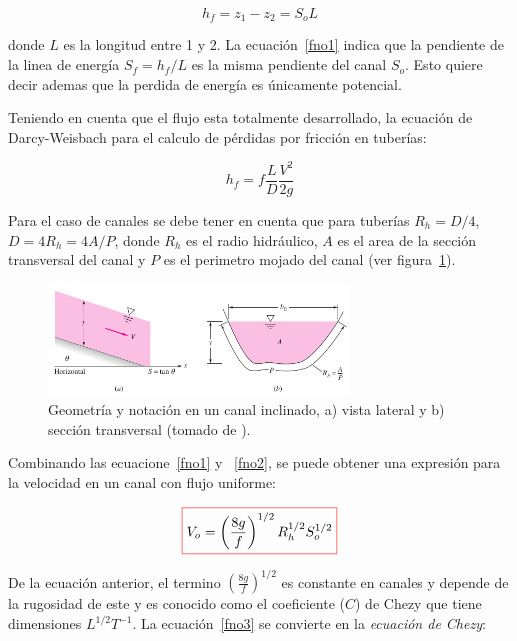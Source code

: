 \documentclass[11pt, oneside]{article}
\begin{document}
\begin{equation}
h_f = z_1 - z_2 = S_o L
\label{fno1}
\end{equation}

donde $L$ es la longitud entre 1 y 2. La ecuaci\'on~\ref{fno1} indica que la pendiente de la linea de energ\'ia $S_f = h_f /L$ es la misma pendiente del canal $S_o$. Esto quiere decir ademas que la perdida de energ\'ia es \'unicamente potencial. 

Teniendo en cuenta que el flujo esta totalmente desarrollado, la ecuaci\'on de Darcy-Weisbach para el calculo de p\'erdidas por fricci\'on en tuber\'ias:

\begin{equation}
h_f = f \frac{L}{D}\frac{V^2}{2g}
\label{fno2}
\end{equation}

Para el caso de canales se debe tener en cuenta que para tuber\'ias $R_h =D/4$, $D = 4R_h = 4A/P$, donde $R_h$ es el radio hidr\'aulico, $A$ es el area de la secci\'on transversal del canal y $P$ es el perimetro mojado del canal (ver figura~\ref{fnor2}).

\begin{figure}[h]
\centering
\includegraphics[width=8cm]{fnor2.png}
\caption{Geometr\'ia y notaci\'on en un canal inclinado, a) vista lateral y b) secci\'on transversal (tomado de \cite{white1990fluid}).}
\label{fnor2}
\end{figure}

Combinando las ecuacione~\ref{fno1} y ~\ref{fno2}, se puede obtener una expresi\'on para la velocidad en un canal con flujo uniforme:

\begin{equation}
\color{red}\boxed{\color{black} V_o = \left( \frac{8g}{f} \right)^{1/2} R_h^{1/2} S_o^{1/2} }
\label{fno3}
\end{equation}

De la ecuaci\'on anterior, el termino $\left( \frac{8g}{f} \right)^{1/2}$ es constante en canales y depende de la rugosidad de este y es conocido como el coeficiente ($C$) de Chezy que tiene dimensiones $L^{1/2} T^{-1}$. La ecuaci\'on~\ref{fno3} se convierte en la \emph{ecuaci\'on de Chezy}:
\end{document}
